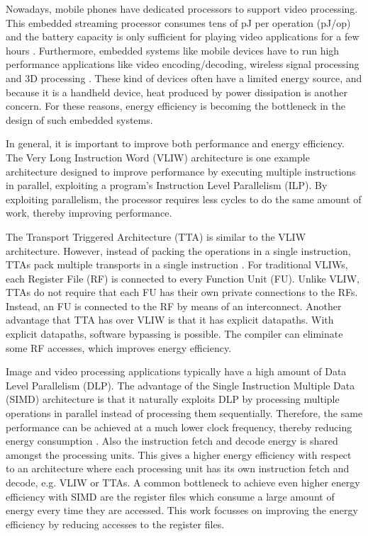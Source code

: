 Nowadays, mobile phones have dedicated processors to support video processing. This embedded streaming processor consumes tens of pJ per operation (pJ/op) and the battery capacity is only sufficient for playing video applications for a few hours \cite{simd}.
Furthermore, embedded systems like mobile devices have to run high performance applications like video encoding/decoding, wireless signal processing and 3D processing \cite{dongrio1}. These kind of devices often have a limited energy source, and because it is a handheld device, heat produced by power dissipation is another concern. For these reasons, energy efficiency is becoming the bottleneck in the design of such embedded systems.

In general, it is important to improve both performance and energy efficiency. The Very Long Instruction Word (VLIW) architecture is one example architecture designed to improve performance by executing multiple instructions in parallel, exploiting a program's Instruction Level Parallelism (ILP). By exploiting parallelism, the processor requires less cycles to do the same amount of work, thereby improving performance. 

The Transport Triggered Architecture (TTA) is similar to the VLIW architecture. However, instead of packing the operations in a single instruction, TTAs pack multiple transports in a single instruction \cite{tta}. For traditional VLIWs, each Register File (RF) is connected to every Function Unit (FU). Unlike VLIW, TTAs do not require that each FU has their own private connections to the RFs. Instead, an FU is connected to the RF by means of an interconnect. Another advantage that TTA has over VLIW is that it has explicit datapaths. With explicit datapaths, software bypassing is possible. The compiler can eliminate some RF accesses, which improves energy efficiency.


Image and video processing applications typically have a high amount of Data Level Parallelism (DLP). The advantage of the Single Instruction Multiple Data (SIMD) architecture is that it naturally exploits DLP by processing multiple operations in parallel instead of processing them sequentially. Therefore, the same performance can be achieved at a much lower clock frequency, thereby reducing energy consumption \cite{dongrio1}. Also the instruction fetch and decode energy is shared amongst the processing units. This gives a higher energy efficiency with respect to an architecture where each processing unit has its own instruction fetch and decode, e.g. VLIW or TTAs. A common bottleneck to achieve even higher energy efficiency with SIMD are the register files which consume a large amount of energy every time they are accessed. This work focusses on improving the energy efficiency by reducing accesses to the register files.

